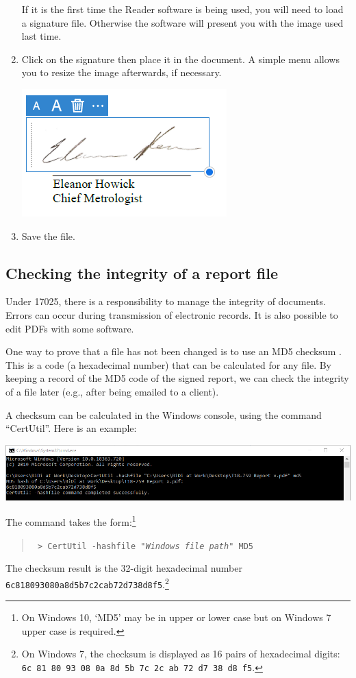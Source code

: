 \begin{enumerate}
If it is the first time the Reader software is being used, you will need to load a signature file. Otherwise the software will present you with the image used last time. 
\item Click on the signature then place it in the document. A simple menu allows you to resize the image afterwards, if necessary. 
\begin{center}
\includegraphics[scale=1]{pictures/acrobat_signing_4}
\end{center}
\item Save the file.
\end{enumerate}

\subsection{Checking the integrity of a report file}
 \label{ss:file_integrity_md5}
 
Under 17025, there is a responsibility to manage the integrity of documents. Errors can occur during transmission of electronic records. It is also possible to edit PDFs with some software.

One way to prove that a file has not been changed is to use an MD5 checksum \cite{MD5}. This is a code (a hexadecimal number) that can be calculated for any file. By keeping a record of the MD5 code of the signed report, we can check the integrity of a file later (e.g., after being emailed to a client). 

A checksum can be calculated in the Windows console, using the command ``CertUtil''. Here is an example:
\begin{center}
\includegraphics[scale=.6]{pictures/md5_cmd}
\end{center}
The command takes the form:\footnote{On Windows 10, `MD5' may be in upper or lower case but on Windows 7 upper case is required.} 
\begin{quote}
\texttt{
> CertUtil -hashfile "\textit{Windows file path}" MD5}
\end{quote}
The checksum result is the 32-digit hexadecimal number \texttt{6c818093080a8d5b7c2cab72d738d8f5}.\footnote{On Windows 7, the checksum is displayed as 16 pairs of hexadecimal digits:  \texttt{6c 81 80 93 08 0a 8d 5b 7c 2c ab 72 d7 38 d8 f5}.}
 
